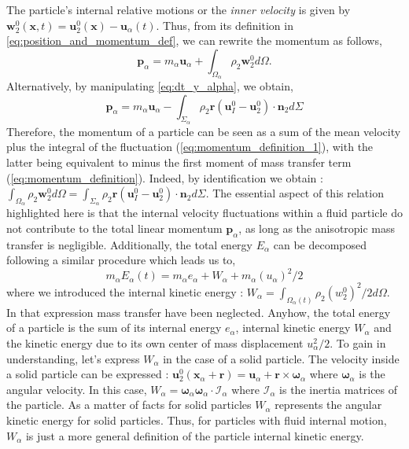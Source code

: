 The particle's internal relative motions or the \textit{inner velocity} is given by $\textbf{w}_2^0(\textbf{x},t) = \textbf{u}_2^0(\textbf{x}) - \textbf{u}_\alpha(t)$.
Thus, from its definition in \ref{eq:position_and_momentum_def}, we can rewrite the momentum as follows,
\begin{equation}
    \label{eq:momentum_definition_1}
    \textbf{p}_\alpha
    = m_\alpha \textbf{u}_\alpha
    + \int_{\Omega_\alpha} \rho_2 \textbf{w}_2^0 d\Omega.
\end{equation}
Alternatively, by manipulating \ref{eq:dt_y_alpha}, we obtain,
\begin{equation}
    \textbf{p}_\alpha
    =  m_\alpha \textbf{u}_\alpha
    - \int_{\Sigma_\alpha} \rho_2\textbf{r}(\textbf{u}_I^0 - \textbf{u}_2^0)\cdot \textbf{n}_2 d\Sigma
    \label{eq:momentum_definition}
\end{equation}
Therefore, the momentum of a particle can be seen as a sum of the mean velocity plus the integral of the fluctuation (\ref{eq:momentum_definition_1}), with the latter being equivalent to minus the first moment of mass transfer term (\ref{eq:momentum_definition}).
Indeed, by identification we obtain : $\int_{\Omega_\alpha} \rho_2 \textbf{w}_2^0 d\Omega =\int_{\Sigma_\alpha}  \rho_2\textbf{r} (\textbf{u}_I^0 - \textbf{u}_2^0)\cdot \textbf{n}_2 d\Sigma$. 
The essential aspect of this relation highlighted here is that the internal velocity fluctuations within a fluid particle do not contribute to the total linear momentum $\textbf{p}_\alpha$, as long as the anisotropic mass transfer is negligible.  
Additionally, the total energy $E_\alpha$ can be decomposed following a similar procedure which leads us to, 
\begin{equation*}
    \label{eq:E_alpha_def}
    m_\alpha E_\alpha(t) 
    = m_\alpha e_\alpha 
    + W_\alpha
    + m_\alpha (u_\alpha)^2/2
\end{equation*}
where we introduced the internal kinetic energy : $W_\alpha = \int_{\Omega_\alpha(t)} \rho_2  (w_2^0)^2/2 d\Omega$. 
In that expression mass transfer have been neglected. 
Anyhow, the total energy of a particle is the sum of its internal energy $e_\alpha$, internal kinetic energy $W_\alpha$ and the kinetic energy  due to its own center of mass displacement $u_\alpha^2/2$. 
To gain in understanding, let's express $W_\alpha$ in the case of a solid particle.
The velocity inside a solid particle can be expressed : $\textbf{u}_2^0(\textbf{x}_\alpha + \textbf{r}) = \textbf{u}_\alpha + \textbf{r}\times \bm{\omega}_\alpha$ where $\bm{\omega}_\alpha$ is the angular velocity.  
In this case, $W_\alpha = \bm{\omega}_\alpha\bm{\omega}_\alpha\cdot \mathcal{I}_\alpha$ where $\mathcal{I}_\alpha$ is the inertia matrices of the particle. 
As a matter of facts for solid particles $W_\alpha$ represents the angular kinetic energy for solid particles.
Thus, for particles with fluid internal motion, $W_\alpha$ is just a more general definition of the particle internal kinetic energy. 

